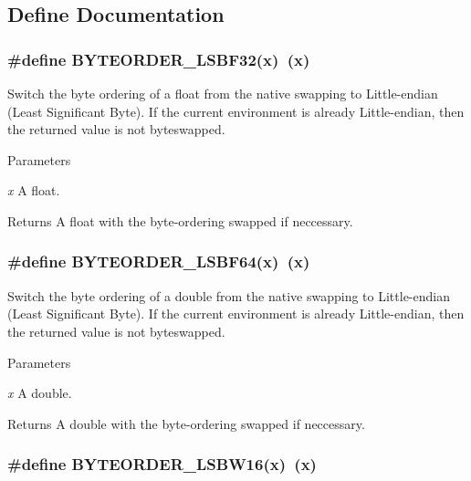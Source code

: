\subsection{Define Documentation}
\hypertarget{group__byteorder_gae8ff7d2f1611389be2d908c8675e344a}{
\subsubsection[{BYTEORDER\_\-LSBF32}]{\setlength{\rightskip}{0pt plus 5cm}\#define BYTEORDER\_\-LSBF32(x)~(x)}}
\label{group__byteorder_gae8ff7d2f1611389be2d908c8675e344a}


Switch the byte ordering of a float from the native swapping to Little-\/endian (Least Significant Byte). If the current environment is already Little-\/endian, then the returned value is not byteswapped.


\begin{DoxyParams}{Parameters}
\item[{\em x}]A float. \end{DoxyParams}
\begin{DoxyReturn}{Returns}
A float with the byte-\/ordering swapped if neccessary. 
\end{DoxyReturn}
\hypertarget{group__byteorder_ga8fe695baca4e41252ee2017b3f2e5068}{
\subsubsection[{BYTEORDER\_\-LSBF64}]{\setlength{\rightskip}{0pt plus 5cm}\#define BYTEORDER\_\-LSBF64(x)~(x)}}
\label{group__byteorder_ga8fe695baca4e41252ee2017b3f2e5068}


Switch the byte ordering of a double from the native swapping to Little-\/endian (Least Significant Byte). If the current environment is already Little-\/endian, then the returned value is not byteswapped.


\begin{DoxyParams}{Parameters}
\item[{\em x}]A double. \end{DoxyParams}
\begin{DoxyReturn}{Returns}
A double with the byte-\/ordering swapped if neccessary. 
\end{DoxyReturn}
\hypertarget{group__byteorder_gaa46359f7d1f29bab74afddacd9decdeb}{
\subsubsection[{BYTEORDER\_\-LSBW16}]{\setlength{\rightskip}{0pt plus 5cm}\#define BYTEORDER\_\-LSBW16(x)~(x)}}
\label{group__byteorder_gaa46359f7d1f29bab74afddacd9decdeb}


